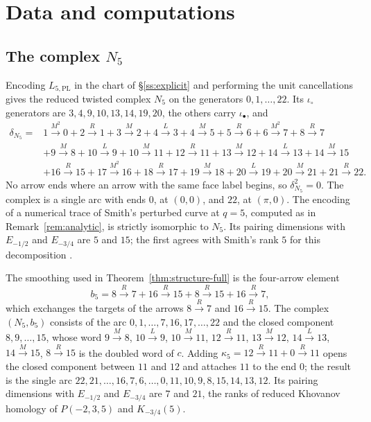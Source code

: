 \section{Data and computations}\label{app:data}

\subsection{The complex \texorpdfstring{$N_5$}{N\_5}}\label{ss:N5}
Encoding $L_{5,\mathrm{PL}}$ in the chart of \S\ref{ss:explicit} and performing the unit
cancellations gives the reduced twisted complex $N_5$ on the generators $0,1,\dots,22$.  Its
$\iota_\circ$ generators are $3,4,9,10,13,14,19,20$, the others carry $\iota_\bullet$, and
\begin{equation}\label{eq:N5}
\begin{aligned}
\delta_{N_5}={}&1\xrightarrow{M^2}0+2\xrightarrow R1+3\xrightarrow M2+4\xrightarrow L3
+4\xrightarrow M5+5\xrightarrow R6+6\xrightarrow{M^2}7+8\xrightarrow R7\\
&+9\xrightarrow M8+10\xrightarrow L9+10\xrightarrow M11+12\xrightarrow R11
+13\xrightarrow M12+14\xrightarrow L13+14\xrightarrow M15\\
&+16\xrightarrow R15+17\xrightarrow{M^2}16+18\xrightarrow R17+19\xrightarrow M18
+20\xrightarrow L19+20\xrightarrow M21+21\xrightarrow R22.
\end{aligned}
\end{equation}
No arrow ends where an arrow with the same face label begins, so $\delta_{N_5}^2=0$.  The complex is a
single arc with ends $0$, at $(0,0)$, and $22$, at $(\pi,0)$.  The encoding of a numerical trace of
Smith's perturbed curve at $q=5$, computed as in Remark~\ref{rem:analytic}, is strictly isomorphic to
$N_5$.  Its pairing dimensions with $E_{-1/2}$ and $E_{-3/4}$ are $5$ and $15$; the first agrees with Smith's
rank $5$ for this decomposition \cite[proof of Thm.~5.9]{Smith}.

The smoothing used in Theorem~\ref{thm:structure-full} is the four-arrow element
\begin{equation}\label{eq:b5}
 b_5=8\xrightarrow R7+16\xrightarrow R15+8\xrightarrow R15+16\xrightarrow R7 ,
\end{equation}
which exchanges the targets of the arrows $8\xrightarrow R7$ and $16\xrightarrow R15$.  The complex
$(N_5,b_5)$ consists of the arc $0,1,\dots,7,16,17,\dots,22$ and the closed component
$8,9,\dots,15$, whose word $9\xrightarrow M8$, $10\xrightarrow L9$, $10\xrightarrow M11$,
$12\xrightarrow R11$, $13\xrightarrow M12$, $14\xrightarrow L13$, $14\xrightarrow M15$,
$8\xrightarrow R15$ is the doubled word of $c$.  Adding $\kappa_5=12\xrightarrow R11+0\xrightarrow
R11$ opens the closed component between $11$ and $12$ and attaches $11$ to the end $0$; the result
is the single arc $22,21,\dots,16,7,6,\dots,0,11,10,9,8,15,14,13,12$.  Its pairing dimensions with
$E_{-1/2}$ and $E_{-3/4}$ are $7$ and $21$, the ranks of reduced Khovanov homology of $P(-2,3,5)$ and
$K_{-3/4}(5)$.

